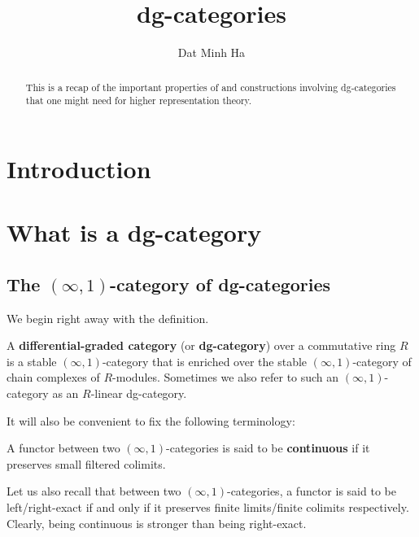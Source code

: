 

\setcounter{section}{-1}





    \title{dg-categories}
    
    \author{Dat Minh Ha}
    \maketitle
    
    \begin{abstract}
        This is a recap of the important properties of and constructions involving dg-categories that one might need for higher representation theory.
    \end{abstract}
    
    {
      \hypersetup{} 
      \tableofcontents %
    }

    \section{Introduction}

    \section{What is a dg-category}
        \subsection{The \texorpdfstring{$(\infty, 1)$}{}-category of dg-categories}
            We begin right away with the definition.
            \begin{definition}[dg-categories] \label{def: dg_categories}
                A \textbf{differential-graded category} (or \textbf{dg-category}) over a commutative ring $R$ is a stable $(\infty, 1)$-category that is enriched over the stable $(\infty, 1)$-category of chain complexes of $R$-modules. Sometimes we also refer to such an $(\infty, 1)$-category as an $R$-linear dg-category.
            \end{definition}

            It will also be convenient to fix the following terminology:
            \begin{definition} \label{def: continuous_functors}
                A functor between two $(\infty, 1)$-categories is said to be \textbf{continuous} if it preserves small filtered colimits. 
            \end{definition}
            Let us also recall that between two $(\infty, 1)$-categories, a functor is said to be left/right-exact if and only if it preserves finite limits/finite colimits respectively. Clearly, being continuous is stronger than being right-exact. 

